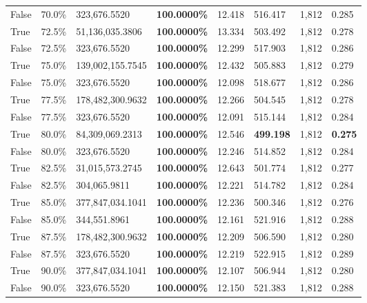 \begin{table}[H]
\begin{tabular}{lllrllll}
\cline{1-8}
False & 70.0\% & 323,676.5520 & \bfseries \color{red} 100.0000\% & 12.418 & 516.417 & 1,812 & 0.285 \\
\cline{1-8}
True & 72.5\% & 51,136,035.3806 & \bfseries \color{red} 100.0000\% & 13.334 & 503.492 & 1,812 & 0.278 \\
\cline{1-8}
False & 72.5\% & 323,676.5520 & \bfseries \color{red} 100.0000\% & 12.299 & 517.903 & 1,812 & 0.286 \\
\cline{1-8}
True & 75.0\% & 139,002,155.7545 & \bfseries \color{red} 100.0000\% & 12.432 & 505.883 & 1,812 & 0.279 \\
\cline{1-8}
False & 75.0\% & 323,676.5520 & \bfseries \color{red} 100.0000\% & 12.098 & 518.677 & 1,812 & 0.286 \\
\cline{1-8}
True & 77.5\% & 178,482,300.9632 & \bfseries \color{red} 100.0000\% & 12.266 & 504.545 & 1,812 & 0.278 \\
\cline{1-8}
False & 77.5\% & 323,676.5520 & \bfseries \color{red} 100.0000\% & 12.091 & 515.144 & 1,812 & 0.284 \\
\cline{1-8}
True & 80.0\% & 84,309,069.2313 & \bfseries \color{red} 100.0000\% & 12.546 & \bfseries \color{red} 499.198 & 1,812 & \bfseries \color{red} 0.275 \\
\cline{1-8}
False & 80.0\% & 323,676.5520 & \bfseries \color{red} 100.0000\% & 12.246 & 514.852 & 1,812 & 0.284 \\
\cline{1-8}
True & 82.5\% & 31,015,573.2745 & \bfseries \color{red} 100.0000\% & 12.643 & 501.774 & 1,812 & 0.277 \\
\cline{1-8}
False & 82.5\% & \color{red} 304,065.9811 & \bfseries \color{red} 100.0000\% & 12.221 & 514.782 & 1,812 & 0.284 \\
\cline{1-8}
True & 85.0\% & 377,847,034.1041 & \bfseries \color{red} 100.0000\% & 12.236 & 500.346 & 1,812 & 0.276 \\
\cline{1-8}
False & 85.0\% & 344,551.8961 & \bfseries \color{red} 100.0000\% & 12.161 & 521.916 & 1,812 & 0.288 \\
\cline{1-8}
True & 87.5\% & 178,482,300.9632 & \bfseries \color{red} 100.0000\% & 12.209 & 506.590 & 1,812 & 0.280 \\
\cline{1-8}
False & 87.5\% & 323,676.5520 & \bfseries \color{red} 100.0000\% & 12.219 & 522.915 & 1,812 & 0.289 \\
\cline{1-8}
True & 90.0\% & 377,847,034.1041 & \bfseries \color{red} 100.0000\% & 12.107 & 506.944 & 1,812 & 0.280 \\
\cline{1-8}
False & 90.0\% & 323,676.5520 & \bfseries \color{red} 100.0000\% & 12.150 & 521.383 & 1,812 & 0.288 \\

\end{tabular}
\end{table}
